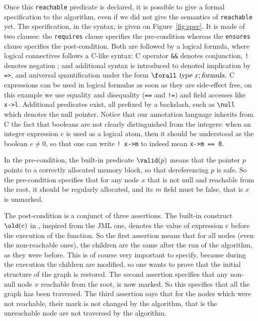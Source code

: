 Once this \texttt{reachable} predicate is declared, it is possible to
give a formal specification to the algorithm, even if we did not give
the semantics of \texttt{reachable} yet. The specification, in the
\caduceus{} syntax, is given on Figure~\ref{fig:spec}. It is made of
two clauses: the \texttt{requires} clause specifies the pre-condition
whereas the \texttt{ensures} clause specifies the post-condition. Both
are followed by a logical formula, where logical connectives follows a
C-like syntax: C operator \verb|&&| denotes conjunction, \verb|!|
denotes negation ; and additional syntax is introduced to denoted
implication by \verb|=>|, and universal quantification under the form
$\bs{}\verb|forall|~\textsl{type}~x ; \textsl{formula}$. C expressions
can be used in logical formulas as soon as they are side-effect free,
on this example we use equality and disequality (\verb|==| and
\verb|!=|) and field accesses like \verb|x->l|. Additional predicates
exist, all prefixed by a backslash, such as \verb|\null| which 
denotes the null pointer. Notice that our annotation language
inherits from C the fact that booleans are not clearly distinguished
from the integers: when an integer expression $e$ is used as a logical
atom, then it should be understood as the boolean $e\neq 0$, so that
one can write \verb|! x->m| to indeed mean \verb|x->m == 0|. 

In the pre-condition, the built-in predicate $\valid(p)$ means that
the pointer $p$ points to a correctly allocated memory block, so that
dereferencing $p$ is safe. So the pre-condition specifies that for any
node $x$ that is not null and reachable from the root, it should be
regularly allocated, and its $m$ field must be false, that is $x$ is
unmarked.

The post-condition is a conjunct of three assertions. The built-in
construct $\old(e)$ in \caduceus{}, inspired from the JML one, denotes
the value of expression $e$ before the execution of the function. So
the first assertion means that for all nodes (even the non-reachable
ones), the children are the same after the run of the algorithm, as
they were before. This is of course very important to specify, because
during the execution the children are modified, so one wants to prove
that the initial structure of the graph is restored. The second
assertion specifies that any non-null node $x$ reachable from the
root, is now marked. So this specifies that all the 
graph has been traversed. The third assertion says that for the nodes
which were not reachable, their mark is not changed by the algorithm,
that is the unreachable node are not traversed by the algorithm.

